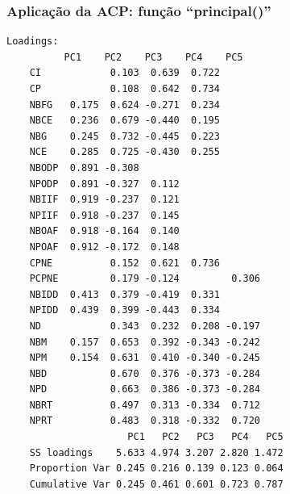 \documentclass{beamer}
\begin{document}
\begin{frame}[fragile] %
	\frametitle{Aplicação da ACP: função ``principal()''}

	\begin{lstlisting}[label={lst:loadings_pca}, basicstyle=\tiny]
	Loadings:
	      PC1    PC2    PC3    PC4    PC5   
	CI            0.103  0.639  0.722       
	CP            0.108  0.642  0.734       
	NBFG   0.175  0.624 -0.271  0.234       
	NBCE   0.236  0.679 -0.440  0.195       
	NBG    0.245  0.732 -0.445  0.223       
	NCE    0.285  0.725 -0.430  0.255       
	NBODP  0.891 -0.308                     
	NPODP  0.891 -0.327  0.112              
	NBIIF  0.919 -0.237  0.121              
	NPIIF  0.918 -0.237  0.145              
	NBOAF  0.918 -0.164  0.140              
	NPOAF  0.912 -0.172  0.148              
	CPNE          0.152  0.621  0.736       
	PCPNE         0.179 -0.124         0.306
	NBIDD  0.413  0.379 -0.419  0.331       
	NPIDD  0.439  0.399 -0.443  0.334       
	ND            0.343  0.232  0.208 -0.197
	NBM    0.157  0.653  0.392 -0.343 -0.242
	NPM    0.154  0.631  0.410 -0.340 -0.245
	NBD           0.670  0.376 -0.373 -0.284
	NPD           0.663  0.386 -0.373 -0.284
	NBRT          0.497  0.313 -0.334  0.712
	NPRT          0.483  0.318 -0.332  0.720
	                 PC1   PC2   PC3   PC4   PC5
	SS loadings    5.633 4.974 3.207 2.820 1.472
	Proportion Var 0.245 0.216 0.139 0.123 0.064
	Cumulative Var 0.245 0.461 0.601 0.723 0.787
	\end{lstlisting}
\end{frame}
\end{document}
